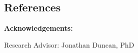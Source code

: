 \documentclass[a0,landscape]{a0poster}
\begin{document}
\begin{multicols}{4}

\begin{tcolorbox}[colback=white,colframe=black]
    \color{DarkSlateGray}
    \begin{center}\section*{References}\end{center}
\end{tcolorbox}
\color{Black}
\nocite{*} %
\begingroup
\renewcommand{\section}[2]{} %
\endgroup
\textbf{Acknowledgements: } 
\par Research Advisor: Jonathan Duncan, PhD 

\end{multicols}
\end{document}
